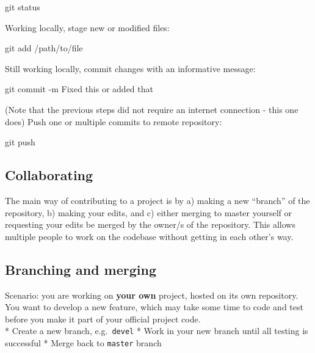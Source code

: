\documentclass[
]{book}
\newenvironment{Shaded}{\begin{snugshade}}{\end{snugshade}}
\newcommand{\FunctionTok}[1]{\textcolor[rgb]{0.00,0.00,0.00}{#1}}
\newcommand{\NormalTok}[1]{#1}
\begin{document}
\begin{Shaded}
\begin{Highlighting}[]
\FunctionTok{git}\NormalTok{ status}
\end{Highlighting}
\end{Shaded}

Working locally, stage new or modified files:

\begin{Shaded}
\begin{Highlighting}[]
\FunctionTok{git}\NormalTok{ add /path/to/file}
\end{Highlighting}
\end{Shaded}

Still working locally, commit changes with an informative message:

\begin{Shaded}
\begin{Highlighting}[]
\FunctionTok{git}\NormalTok{ commit {-}m Fixed this or added that}
\end{Highlighting}
\end{Shaded}

(Note that the previous steps did not require an internet connection - this one does)
Push one or multiple commits to remote repository:

\begin{Shaded}
\begin{Highlighting}[]
\FunctionTok{git}\NormalTok{ push}
\end{Highlighting}
\end{Shaded}

\hypertarget{collaborating}{%
\subsection{Collaborating}\label{collaborating}}

The main way of contributing to a project is by a) making a new ``branch'' of the repository, b) making your edits, and c) either merging to master yourself or requesting your edits be merged by the owner/s of the repository.
This allows multiple people to work on the codebase without getting in each other's way.

\hypertarget{branching-and-merging}{%
\subsection{Branching and merging}\label{branching-and-merging}}

Scenario: you are working on \textbf{your own} project, hosted on its own repository. You want to develop a new feature, which may take some time to code and test before you make it part of your official project code.\\
* Create a new branch, e.g.~\texttt{devel}
* Work in your new branch until all testing is successful
* Merge back to \texttt{master} branch
\end{document}
